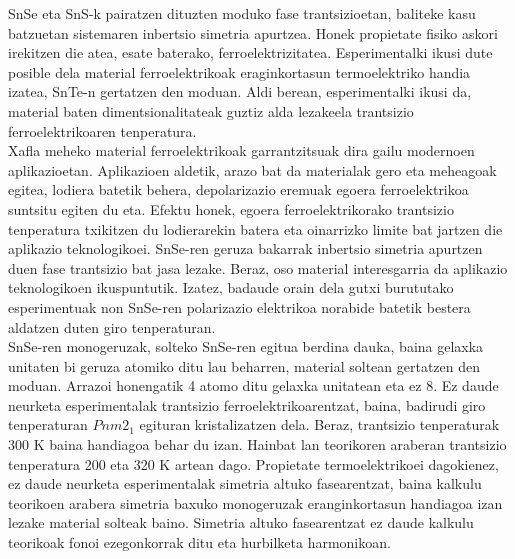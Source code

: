 SnSe eta SnS-k pairatzen dituzten moduko fase trantsizioetan, baliteke kasu batzuetan sistemaren inbertsio simetria 
apurtzea\cite{ribeiro2018strong,chang2016discovery}. Honek propietate fisiko askori irekitzen die atea, esate 
baterako, ferroelektrizitatea. Esperimentalki ikusi dute posible dela material ferroelektrikoak eraginkortasun 
termoelektriko handia izatea\cite{ribeiro2018strong,zhang2013high}, SnTe-n gertatzen den moduan. Aldi 
berean, esperimentalki ikusi da, material baten dimentsionalitateak guztiz alda lezakeela trantsizio 
ferroelektrikoaren tenperatura. \\

Xafla meheko material ferroelektrikoak garrantzitsuak dira gailu modernoen 
aplikazioetan\cite{lallart2011ferroelectrics}. Aplikazioen aldetik, arazo bat da materialak gero eta meheagoak 
egitea, lodiera batetik behera, depolarizazio eremuak egoera ferroelektrikoa 
suntsitu\cite{batra1973new,zhong1994giant,dawber2005physics} egiten du eta. Efektu honek, egoera ferroelektrikorako 
trantsizio tenperatura txikitzen du lodierarekin batera eta oinarrizko limite bat jartzen die aplikazio 
teknologikoei. SnSe-ren geruza bakarrak\cite{chang2020controlled} inbertsio simetria apurtzen duen fase trantsizio 
bat jasa lezake. Beraz, oso material interesgarria da aplikazio teknologikoen ikuspuntutik. Izatez, badaude orain 
dela gutxi burututako esperimentuak\cite{chang2020controlled} non SnSe-ren polarizazio elektrikoa norabide batetik 
bestera aldatzen duten giro tenperaturan. \\

SnSe-ren monogeruzak, solteko SnSe-ren egitua berdina dauka, baina gelaxka unitaten bi geruza atomiko ditu lau 
beharren, material soltean gertatzen den moduan. Arrazoi honengatik 4 atomo ditu gelaxka unitatean eta ez 8. Ez 
daude neurketa esperimentalak trantsizio ferroelektrikoarentzat, baina, badirudi giro tenperaturan $Pnm2_{1}$ 
egituran kristalizatzen dela. Beraz, trantsizio tenperaturak 300 K baina handiagoa behar du izan. Hainbat lan 
teorikoren araberan\cite{mehboudi2016structural,barraza2018tuning} trantsizio tenperatura 200 eta 320 K artean dago. 
Propietate termoelektrikoei dagokienez, ez daude neurketa esperimentalak simetria altuko fasearentzat, baina kalkulu 
teorikoen arabera\cite{wang2015thermoelectric,hu2017high} simetria baxuko monogeruzak eranginkortasun handiagoa izan 
lezake material solteak baino. Simetria altuko fasearentzat ez daude kalkulu teorikoak fonoi ezegonkorrak ditu eta 
hurbilketa harmonikoan. \\

